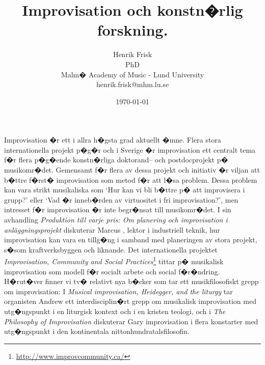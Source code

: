 \documentclass[a4paper]{article}
\title{Improvisation och konstn�rlig forskning.}
\author{Henrik Frisk\\{\small PhD}\\{\small Malm� Academy of Music - Lund University}\\{\small henrik.frisk@mhm.lu.se}}
\date{\today}
\begin{document}
\maketitle

\thispagestyle{empty}

Improvisation �r ett i allra h�gsta grad aktuellt �mne. Flera stora internationella projekt p�g�r och i Sverige �r improvisation ett centralt tema f�r flera p�g�ende konstn�rliga doktorand-- och postdocprojekt p� musikomr�det. 
Gemensamt f�r flera av dessa projekt och initiativ �r viljan att b�ttre f�rst� improvisation som metod f�r att l�sa problem. Dessa problem kan vara strikt musikaliska som `Hur kan vi bli b�ttre p� att improvisera i grupp?' eller `Vad �r inneb�rden av virtuositet i fri improvisation?', men intresset f�r improvisation �r inte begr�nsat till musikomr�det. I sin avhandling \emph{Produktion till varje pris: Om planering och improvisation i anl{\"a}ggningsprojekt} diskuterar Marcus \citet{lindahl03}, lektor i industriell teknik, hur improvisation kan vara en tillg�ng i samband med planeringen av stora projekt, s�som kraftverksbyggen och liknande. Det internationella projektet \emph{Improvisation, Community and Social Practices}\footnote{\url{http://www.improvcommunity.ca/}} tittar p� musikalisk improvisation som modell f�r socialt arbete och social f�r�ndring. H�rut�ver finner vi tv� relativt nya b�cker som tar ett musikfilosofiskt grepp om improvisation: I \emph{Musical improvisation, Heidegger, and the liturgy} tar organisten Andrew \citet{love03} ett interdisciplin�rt grepp om musikalisk improvisation med utg�ngspunkt i en liturgisk kontext och i en kristen teologi, och i \emph{The Philosophy of Improvisation} diskuterar Gary \citet{peters09} improvisation i flera konstarter med utg�ngspunkt i den kontinentala nittonhundratalsfilosofin.
\end{document}
